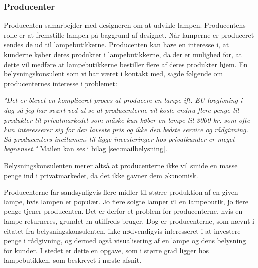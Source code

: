 \subsubsection{Producenter}
Producenten samarbejder med designeren om at udvikle lampen. Producentens rolle er at fremstille lampen på baggrund af designet. Når lamperne er produceret sendes de ud til lampebutikkerne. Producenten kan have en interesse i, at kunderne køber deres produkter i lampebutikkerne, da der er mulighed for, at dette vil medføre at lampebutikkerne bestiller flere af deres produkter hjem. En belysningskonsulent som vi har været i kontakt med, sagde følgende om producenternes interesse i problemet:

\begin{center}
\textit{"Det er blevet en kompliceret proces at producere en lampe ift. EU lovgivning i dag så jeg har svært ved at se at producenterne vil koste endnu flere penge til produkter til privatmarkedet som måske kun køber en lampe til 3000 kr. som ofte kun interesserer sig for den laveste pris og ikke den bedste service og rådgivning. Så producenters incitament til ligge investeringer hos privatkunder er meget begrænset."} Mailen kan ses i bilag \ref{sec:mailbelysning}. 
\end{center}

Belysningskonsulenten mener altså at producenterne ikke vil smide en masse penge ind i privatmarkedet, da det ikke gavner dem økonomisk. 

Producenterne får sandsynligvis flere midler til større produktion af en given lampe, hvis lampen er populær. Jo flere solgte lamper til en lampebutik, jo flere penge tjener producenten. Det er derfor et problem for producenterne, hvis en lampe returneres, grundet en utilfreds bruger. Dog er producenterne, som nævnt i citatet fra belysningskonsulenten, ikke nødvendigvis interesseret i at investere penge i rådgivning, og dermed også visualisering af en lampe og dens belysning for kunder. I stedet er dette en opgave, som i større grad ligger hos lampebutikken, som beskrevet i næste afsnit.
